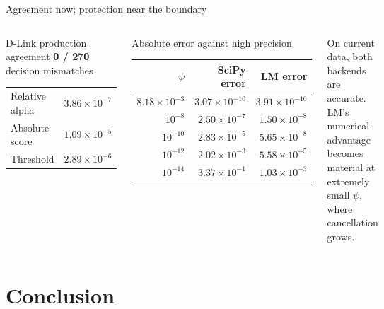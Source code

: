 \documentclass[aspectratio=169,10pt]{beamer}
\begin{document}
\begin{frame}{Agreement now; protection near the boundary}
\begin{columns}[T,onlytextwidth]
\begin{exampleblock}{D-Link production agreement}
\centering
\Large\textbf{0 / 270}\\[-0.04cm]
\small decision mismatches\\[0.30cm]
\scriptsize
\begin{tabular}{@{}lr@{}}
Relative alpha & $3.86\times10^{-7}$\\
Absolute score & $1.09\times10^{-5}$\\
Threshold & $2.89\times10^{-6}$
\end{tabular}
\end{exampleblock}

\begin{block}{Absolute error against high precision}
\centering
\scriptsize
\begin{tabular}{@{}rrr@{}}
\toprule
$\psi$ & SciPy error & LM error \\
\midrule
$8.18\times10^{-3}$ & $3.07\times10^{-10}$ & $3.91\times10^{-10}$ \\
$10^{-8}$ & $2.50\times10^{-7}$ & $1.50\times10^{-8}$ \\
$10^{-10}$ & $2.83\times10^{-5}$ & $5.65\times10^{-8}$ \\
$10^{-12}$ & $2.02\times10^{-3}$ & $5.58\times10^{-5}$ \\
$10^{-14}$ & $3.37\times10^{-1}$ & $1.03\times10^{-3}$ \\
\bottomrule
\end{tabular}
\end{block}

\small On current data, both backends are accurate. LM's numerical advantage
becomes material at extremely small $\psi$, where cancellation grows.
\end{columns}
\end{frame}

\section{Conclusion}
\end{document}
